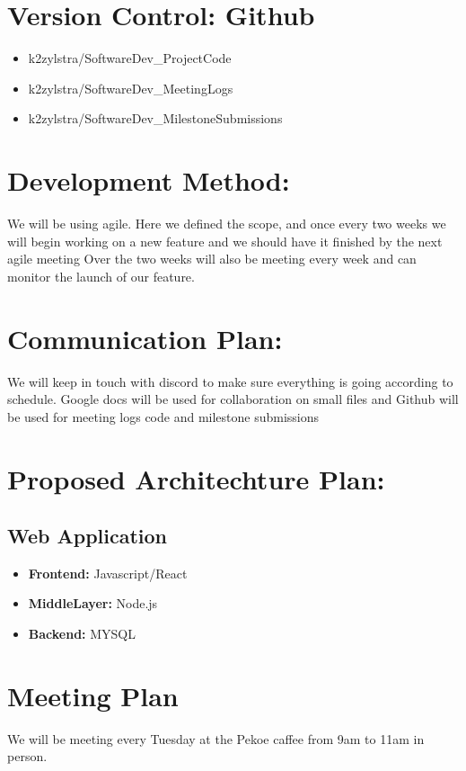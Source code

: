 \documentclass{article}
\begin{document}
	\section*{Version Control: Github}
	\begin{itemize}
		\item k2zylstra/SoftwareDev\_ProjectCode
		\item k2zylstra/SoftwareDev\_MeetingLogs
		\item k2zylstra/SoftwareDev\_MilestoneSubmissions
	\end{itemize}
	\section*{Development Method:}
	We will be using agile. Here we defined the scope, and once every two weeks we will
	begin working on a new feature and we should have it finished by the next agile meeting
	Over the two weeks will also be meeting every week and can monitor the launch of our
	feature.
	\section*{Communication Plan:}
	We will keep in touch with discord to make sure everything
	is going according to schedule. Google docs will be used for collaboration on small
	files and Github will be used for meeting logs code and milestone submissions
	\section*{Proposed Architechture Plan:}
	\subsection*{Web Application}
	\begin{itemize}
		\item \textbf{Frontend:} Javascript/React
		\item \textbf{MiddleLayer:} Node.js
		\item \textbf{Backend:} MYSQL
	\end{itemize}
	\section*{Meeting Plan}
	We will be meeting every Tuesday at the Pekoe caffee from 9am to 11am in person.
\end{document}
